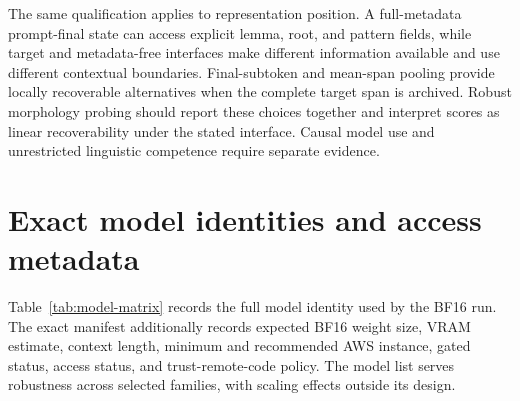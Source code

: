 \documentclass[pdflatex,sn-basic]{sn-jnl}
\begin{document}
The same qualification applies to representation position. A full-metadata
prompt-final state can access explicit lemma, root, and pattern fields, while
target and metadata-free interfaces make different information available and
use different contextual boundaries. Final-subtoken and mean-span pooling
provide locally recoverable alternatives when the complete target span is
archived. Robust morphology probing should report these choices together and
interpret scores as linear recoverability under the stated interface. Causal
model use and unrestricted linguistic competence require separate evidence.

\appendix

\section{Exact model identities and access metadata}\label{app:models}

Table~\ref{tab:model-matrix} records the full model identity used by the BF16
run. The exact manifest additionally records expected BF16 weight size, VRAM
estimate, context length, minimum and recommended AWS instance, gated status,
access status, and trust-remote-code policy. The model list serves robustness
across selected families, with scaling effects outside its design.
\end{document}
